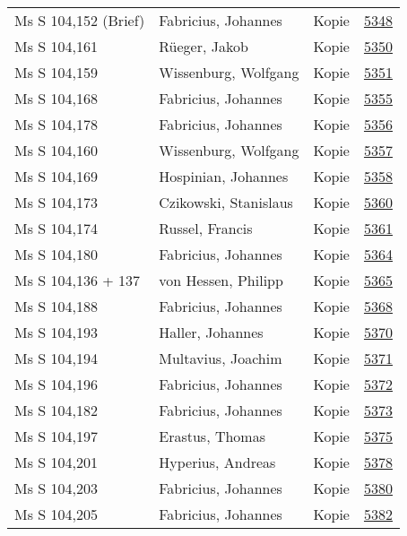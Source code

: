 \documentclass[10pt,a4paper,landscape]{report}
\begin{document}
\begin{longtable}{p{16cm}p{4cm}lr}
Ms S 104,152 (Brief)	&	Fabricius, Johannes	&	Kopie	&	\href{http://130.60.24.72/assignment/5348}{5348}\\
Ms S 104,161	&	Rüeger, Jakob	&	Kopie	&	\href{http://130.60.24.72/assignment/5350}{5350}\\
Ms S 104,159	&	Wissenburg, Wolfgang	&	Kopie	&	\href{http://130.60.24.72/assignment/5351}{5351}\\
Ms S 104,168	&	Fabricius, Johannes	&	Kopie	&	\href{http://130.60.24.72/assignment/5355}{5355}\\
Ms S 104,178	&	Fabricius, Johannes	&	Kopie	&	\href{http://130.60.24.72/assignment/5356}{5356}\\
Ms S 104,160	&	Wissenburg, Wolfgang	&	Kopie	&	\href{http://130.60.24.72/assignment/5357}{5357}\\
Ms S 104,169	&	Hospinian, Johannes	&	Kopie	&	\href{http://130.60.24.72/assignment/5358}{5358}\\
Ms S 104,173	&	Czikowski, Stanislaus	&	Kopie	&	\href{http://130.60.24.72/assignment/5360}{5360}\\
Ms S 104,174	&	Russel, Francis	&	Kopie	&	\href{http://130.60.24.72/assignment/5361}{5361}\\
Ms S 104,180	&	Fabricius, Johannes	&	Kopie	&	\href{http://130.60.24.72/assignment/5364}{5364}\\
Ms S 104,136 + 137	&	von Hessen, Philipp	&	Kopie	&	\href{http://130.60.24.72/assignment/5365}{5365}\\
Ms S 104,188	&	Fabricius, Johannes	&	Kopie	&	\href{http://130.60.24.72/assignment/5368}{5368}\\
Ms S 104,193	&	Haller, Johannes	&	Kopie	&	\href{http://130.60.24.72/assignment/5370}{5370}\\
Ms S 104,194	&	Multavius, Joachim	&	Kopie	&	\href{http://130.60.24.72/assignment/5371}{5371}\\
Ms S 104,196	&	Fabricius, Johannes	&	Kopie	&	\href{http://130.60.24.72/assignment/5372}{5372}\\
Ms S 104,182	&	Fabricius, Johannes	&	Kopie	&	\href{http://130.60.24.72/assignment/5373}{5373}\\
Ms S 104,197	&	Erastus, Thomas	&	Kopie	&	\href{http://130.60.24.72/assignment/5375}{5375}\\
Ms S 104,201	&	Hyperius, Andreas	&	Kopie	&	\href{http://130.60.24.72/assignment/5378}{5378}\\
Ms S 104,203	&	Fabricius, Johannes	&	Kopie	&	\href{http://130.60.24.72/assignment/5380}{5380}\\
Ms S 104,205	&	Fabricius, Johannes	&	Kopie	&	\href{http://130.60.24.72/assignment/5382}{5382}\\

\end{longtable}
\end{document}
